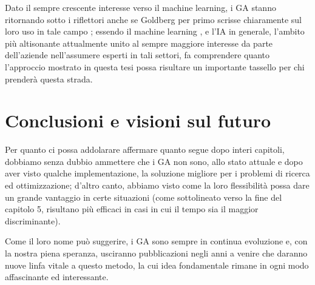 Dato il sempre crescente interesse verso il machine learning, i GA stanno ritornando sotto i riflettori anche se Goldberg per primo scrisse chiaramente sul loro uso in tale campo \cite{goldberg1} \cite{end7}; essendo il machine learning \cite{end4} \cite{end5}, e l'IA in generale, l'ambito pi\`u altisonante attualmente unito al sempre maggiore interesse da parte dell'aziende nell'assumere esperti in tali settori, fa comprendere quanto l'approccio mostrato in questa tesi possa risultare un importante tassello per chi prender\`a questa strada.
\section{Conclusioni e visioni sul futuro}
Per quanto ci possa addolarare affermare quanto segue dopo interi capitoli, dobbiamo senza dubbio ammettere che i GA non sono, allo stato attuale e dopo aver visto qualche implementazione, la soluzione migliore per i problemi di ricerca ed ottimizzazione; d'altro canto, abbiamo visto come la loro flessibilit\`a possa dare un grande vantaggio in certe situazioni (come sottolineato verso la fine del capitolo 5, risultano pi\`u efficaci in casi in cui il tempo sia il maggior discriminante).
\vspace{3mm}

Come il loro nome pu\`o suggerire, i GA sono sempre in continua evoluzione e, con la nostra piena speranza, usciranno pubblicazioni negli anni a venire che daranno nuove linfa vitale a questo metodo, la cui idea fondamentale rimane in ogni modo affascinante ed interessante.
\newpage